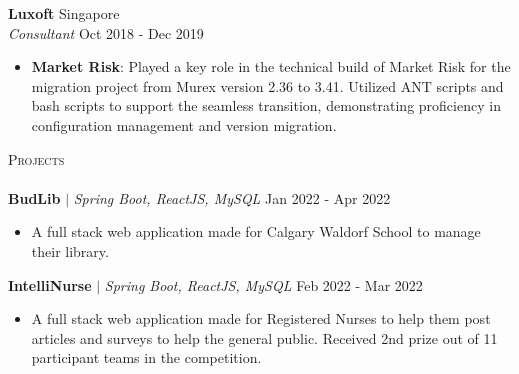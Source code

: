 \documentclass[a4paper]{article}
\newcommand{\lineunder} {
    \vspace*{-8pt} \\
    \hspace*{-18pt} \hrulefill \\
}
\newcommand{\header} [1] {
    \vspace*{5pt}
    {\hspace*{-18pt}\vspace*{6pt} \large\textsc{#1}}
    \vspace*{-6pt} \lineunder
}
\newcommand{\resumeHeadingExperience}[4]{
    \textbf{#1} \hfill {#2}\\
    \textit{#3} \hfill {#4}\\
    \vspace{-3mm}
}
\newcommand{\resumeItemExperience}[2]{
  \item{
    \begin{justify}
    \setlength{\rightskip}{0.15in} \textbf{#1}{: #2 \vspace{-2pt}}
    \end{justify}
  }
}
\newcommand{\resumeHeadingProject}[3]{
    \vspace{1mm}
    {\textbf{#1}} $|$ \emph{#2} \hfill {#3}
    \vspace{-1.5mm}
}
\newcommand{\resumeItemProject}[1]{
  \item{
    \begin{justify}
    \setlength{\rightskip}{0.15in} {#1 \vspace{-4pt}}
    \end{justify}
  }
}
\begin{document}
\resumeHeadingExperience {Luxoft} {Singapore} {Consultant} {Oct 2018 - Dec 2019}
\begin{itemize} \itemsep 1pt
    \resumeItemExperience{Market Risk} {Played a key role in the technical build of Market Risk for the migration project from Murex version 2.36 to 3.41. Utilized ANT scripts and bash scripts to support the seamless transition, demonstrating proficiency in configuration management and version migration.}
\end{itemize}




\header{Projects}

\resumeHeadingProject {BudLib} {Spring Boot, ReactJS, MySQL} {Jan 2022 - Apr 2022}
\begin{itemize}
    \resumeItemProject {A full stack web application made for Calgary Waldorf School to manage their library.}
\end{itemize}

\resumeHeadingProject {IntelliNurse} {Spring Boot, ReactJS, MySQL} {Feb 2022 - Mar 2022}
\begin{itemize}
    \resumeItemProject {A full stack web application made for Registered Nurses to help them post articles and surveys to help the general public. Received 2nd prize out of 11 participant teams in the competition.}
\end{itemize}
\end{document}
